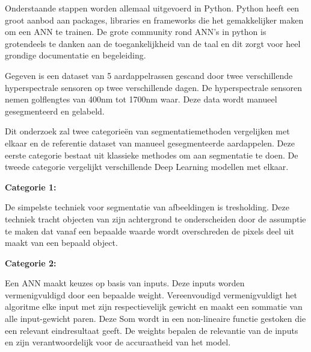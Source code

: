 

Onderstaande stappen worden allemaal uitgevoerd in Python. Python heeft een groot aanbod aan packages, libraries en frameworks die het gemakkelijker maken om een ANN te trainen. De grote community rond ANN's in python is grotendeels te danken aan de toegankelijkheid van de taal en dit zorgt voor heel grondige documentatie en begeleiding.

Gegeven is een dataset van 5 aardappelrassen gescand door twee verschillende hyperspectrale sensoren op twee verschillende dagen. De hyperspectrale sensoren nemen golflengtes van 400nm tot 1700nm waar. Deze data wordt manueel gesegmenteerd en gelabeld.

Dit onderzoek zal twee categorieën van segmentatiemethoden vergelijken met elkaar en de referentie dataset van manueel gesegmenteerde aardappelen. Deze eerste categorie bestaat uit klassieke methodes om aan segmentatie te doen. De tweede categorie vergelijkt verschillende Deep Learning modellen met elkaar.

\textbf{Categorie 1:}

De simpelste techniek voor segmentatie van afbeeldingen is tresholding. Deze techniek tracht objecten van zijn achtergrond te onderscheiden door de assumptie te maken dat vanaf een bepaalde waarde wordt overschreden de pixels deel uit maakt van een bepaald object.

\textbf{Categorie 2:}

Een ANN maakt keuzes op basis van inputs. Deze inputs worden vermenigvuldigd door een bepaalde weight. Vereenvoudigd vermenigvuldigt het algoritme elke input met zijn respectievelijk gewicht en maakt een sommatie van alle input-gewicht paren.  Deze Som wordt in een non-lineaire functie gestoken die een relevant eindresultaat geeft. De weights bepalen de relevantie van de inputs en zijn verantwoordelijk voor de accuraatheid van het model.

